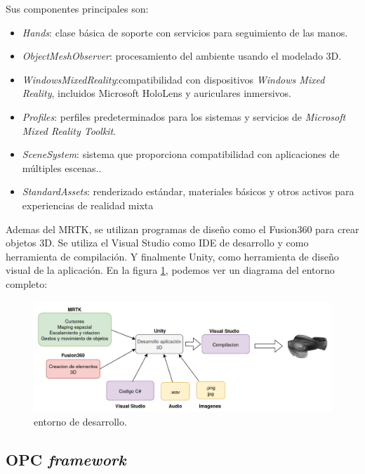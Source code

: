
Sus componentes principales son:
\begin{itemize}
\item \textit{Hands}: clase básica de soporte con servicios para seguimiento de las manos.
\item \textit{ObjectMeshObserver}: procesamiento del ambiente usando el modelado 3D.
\item \textit{WindowsMixedReality}:compatibilidad con dispositivos \textit{Windows Mixed Reality}, incluidos Microsoft HoloLens y auriculares inmersivos.
\item \textit{Profiles}: perfiles predeterminados para los sistemas y servicios de \textit{Microsoft Mixed Reality Toolkit}.
\item \textit{SceneSystem}: sistema que proporciona compatibilidad con aplicaciones de múltiples escenas..
\item \textit{StandardAssets}: renderizado estándar, materiales básicos y otros activos para experiencias de realidad mixta
\end{itemize}

Ademas del MRTK, se utilizan programas de diseño como el Fusion360 para crear objetos 3D. Se utiliza el Visual Studio como IDE de desarrollo y como herramienta de compilación. Y finalmente Unity, como herramienta de diseño visual de la aplicación. En la figura \ref{fig:workflow}, podemos ver un diagrama del entorno completo:

\begin{figure}[htpb]
	\centering
	\includegraphics[width=\textwidth]{./Figures/workflow.png}
	\caption{entorno de desarrollo\protect\footnotemark.}
	\label{fig:workflow}
\end{figure}


\subsection{OPC \textit{framework}}

